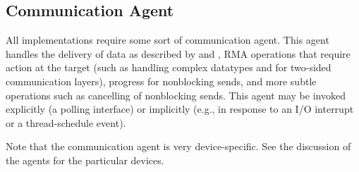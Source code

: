 \documentclass{article}
\begin{document}
\subsection{Communication Agent}
\label{sec:comm-agent}
All implementations require some sort of communication agent.  This agent
handles the delivery of data as described by  and
, RMA operations that require action at the target (such as
handling complex datatypes and for two-sided communication layers),
progress for nonblocking sends, and more
subtle operations such as cancelling of nonblocking sends.  This agent may be
invoked explicitly (a polling interface) or implicitly (e.g., in response to
an I/O interrupt or a thread-schedule event).  

Note that the communication agent is very device-specific.  See the
discussion of the agents for the particular devices.

\end{document}
